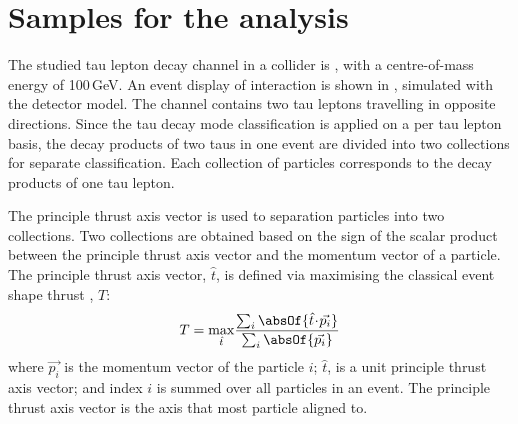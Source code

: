 \section{Samples for the analysis}
\label{sec:tauDecayModes}

The studied tau lepton decay channel in a \ee collider is \eeToTauTau, with a centre-of-mass energy of 100\,GeV.  An event display of \eeToTauTau interaction is shown in , simulated with the \ILD detector model. The \eeToTauTau channel contains two tau leptons travelling in opposite directions. Since the tau decay mode classification is applied on a per tau lepton basis, the decay products of two taus in one event are divided into two collections for separate classification. Each collection of particles corresponds  to the decay products of one tau lepton.

The principle thrust axis vector is used to separation particles into two collections. Two collections are obtained based on the sign of the scalar product between the principle thrust axis vector  and the momentum vector of a particle. The principle thrust axis vector, $\hat{t}$, is defined via maximising the classical event shape thrust \cite{PhysRevLett.39.1587}, $T$:
\begin{equation}
T = \max_{\hat{t}}\!\frac{\sum_{i}\absOf{\hat{t}\!\cdot\!\vec{p_{i}}}}{\sum_{i}\absOf{\vec{p_{i}}}}
\end{equation}
where $\vec{p_{i}}$ is the momentum vector of the particle $i$;   $\hat{t}$, is a unit principle thrust axis vector; and index $i$ is summed over all particles in an event. The principle thrust axis vector is the axis that most particle aligned to.



